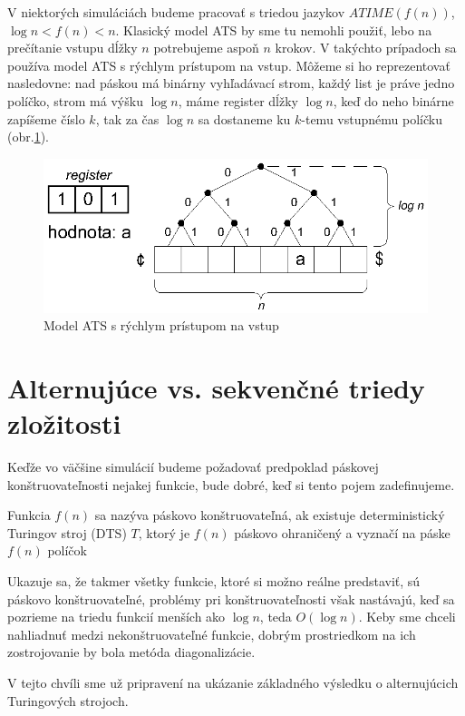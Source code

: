 V niektorých simuláciách budeme pracovať s triedou jazykov
$ATIME(f(n))$, $\log n<f(n)<n$. Klasický model ATS by sme tu
nemohli použiť, lebo na prečítanie vstupu dĺžky $n$ potrebujeme
aspoň $n$ krokov. V takýchto prípadoch sa používa model ATS s
rýchlym prístupom na vstup. Môžeme si ho reprezentovať nasledovne:
nad páskou má binárny vyhľadávací strom, každý list je práve jedno
políčko, strom má výšku $\log n$, máme register dĺžky $\log n$,
keď do neho binárne zapíšeme číslo $k$, tak za čas $\log n$ sa
dostaneme ku $k$-temu vstupnému políčku (obr.\ref{rychly}).

\begin{figure}[!ht]
  \centering
  \includegraphics{img/rychly}
  \caption{Model ATS s rýchlym prístupom na vstup} \label{rychly}
\end{figure}

\section{Alternujúce vs. sekvenčné triedy zložitosti}

Keďže vo väčšine simulácií budeme požadovať predpoklad páskovej
konštruovateľnosti nejakej funkcie, bude dobré, keď si tento pojem
zadefinujeme.

\begin{definicia}
  Funkcia $f(n)$ sa nazýva páskovo konštruovateľná, ak existuje
  deterministický Turingov stroj (DTS) $T$, ktorý je $f(n)$ páskovo
  ohraničený a vyznačí na páske $f(n)$ políčok
\end{definicia}

Ukazuje sa, že takmer všetky funkcie, ktoré si možno reálne
predstaviť, sú páskovo konštruovateľné, problémy pri
konštruovateľnosti však nastávajú, keď sa pozrieme na triedu
funkcií menších ako $\log n$, teda $O(\log n)$. Keby sme chceli
nahliadnuť medzi nekonštruovateľné funkcie, dobrým prostriedkom na
ich zostrojovanie by bola metóda diagonalizácie.

\smallskip
V tejto chvíli sme už pripravení na ukázanie základného výsledku o
alternujúcich Turingových strojoch.

